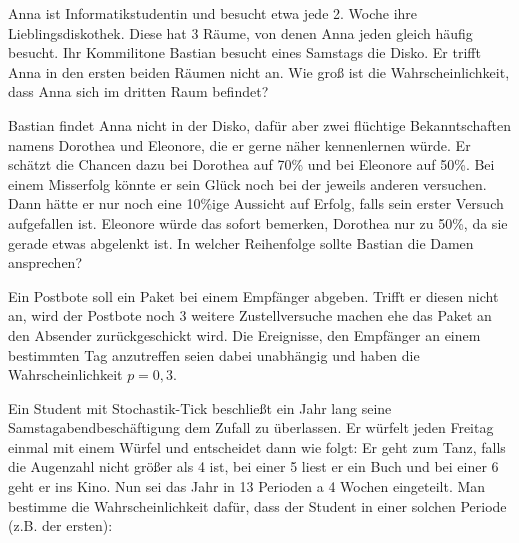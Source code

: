\documentclass[10pt, a4paper]{exam}
\begin{document}
\begin{questions}
    \question Anna ist Informatikstudentin und besucht etwa jede 2. Woche ihre Lieblingsdiskothek. Diese hat 3 Räume, von denen Anna jeden gleich häufig besucht. Ihr Kommilitone Bastian besucht eines Samstags die Disko. Er trifft Anna in den ersten beiden Räumen nicht an. Wie groß ist die Wahrscheinlichkeit, dass Anna sich im dritten Raum befindet?
    \begin{solution}
    \end{solution}

    \question Bastian findet Anna nicht in der Disko, dafür aber zwei flüchtige Bekanntschaften namens Dorothea und Eleonore, die er gerne näher kennenlernen würde. Er schätzt die Chancen dazu bei Dorothea auf 70\% und bei Eleonore auf 50\%. Bei einem Misserfolg könnte er sein Glück noch bei der jeweils anderen versuchen. Dann hätte er nur noch eine 10\%ige Aussicht auf Erfolg, falls sein erster Versuch aufgefallen ist. Eleonore würde das sofort bemerken, Dorothea nur zu 50\%, da sie gerade etwas abgelenkt ist. In welcher Reihenfolge sollte Bastian die Damen ansprechen?
    \begin{solution}
    \end{solution}

    \question Ein Postbote soll ein Paket bei einem Empfänger abgeben. Trifft er diesen nicht an, wird der Postbote noch 3 weitere Zustellversuche machen ehe das Paket an den Absender zurückgeschickt wird. Die Ereignisse, den Empfänger an einem bestimmten Tag anzutreffen seien dabei unabhängig und haben die Wahrscheinlichkeit $p=0,3$.

    \question Ein Student mit Stochastik-Tick beschließt ein Jahr lang seine Samstagabendbeschäftigung dem Zufall zu überlassen. Er würfelt jeden Freitag einmal mit einem Würfel und entscheidet dann wie folgt: Er geht zum Tanz, falls die Augenzahl nicht größer als 4 ist, bei einer 5 liest er ein Buch und bei einer 6 geht er ins Kino. Nun sei das Jahr in 13 Perioden a 4 Wochen eingeteilt. Man bestimme die Wahrscheinlichkeit dafür, dass der Student in einer solchen Periode (z.B. der ersten):
    \begin{parts}

\end{parts}
\end{questions}
\end{document}
